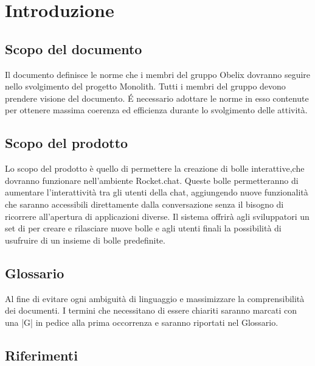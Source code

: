 \section{Introduzione}

\subsection{Scopo del documento}

Il documento definisce le norme che i membri del gruppo Obelix
dovranno seguire nello svolgimento del progetto Monolith. Tutti i
membri del gruppo devono prendere visione del documento. \'E necessario
adottare le norme in esso contenute per ottenere massima coerenza ed
efficienza durante lo svolgimento delle attività. 

\subsection{Scopo del prodotto}

Lo scopo del prodotto è quello di permettere la creazione 
di bolle interattive,che dovranno funzionare nell’ambiente
Rocket.chat. Queste bolle permetteranno di aumentare l'interattività
tra gli utenti della chat, aggiungendo nuove funzionalità che
saranno accessibili direttamente dalla conversazione senza il bisogno
di ricorrere all'apertura di applicazioni diverse. 
Il sistema offrirà agli sviluppatori un set di  per creare e
rilasciare nuove bolle e agli utenti finali la possibilità di
usufruire di un insieme di bolle predefinite.  

\subsection{Glossario}

Al fine di evitare ogni ambiguità di linguaggio e massimizzare la
comprensibilità dei documenti. I termini che necessitano di essere
chiariti saranno marcati con una |G| in pedice alla prima occorrenza e saranno
riportati nel Glossario. 

\subsection{Riferimenti}

